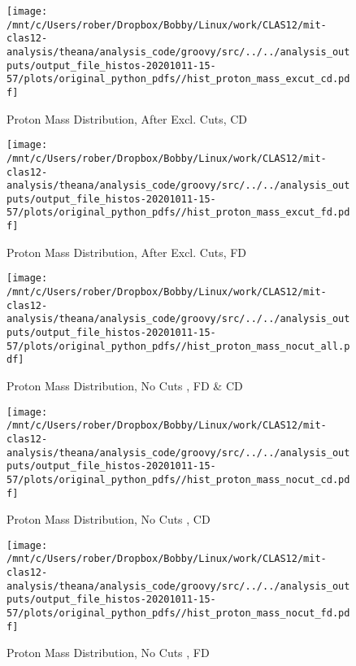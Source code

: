 \documentclass{article}
\begin{document}
\begin{landscape}
\begin{figure}[h]
        \texttt{[image: /mnt/c/Users/rober/Dropbox/Bobby/Linux/work/CLAS12/mit-clas12-analysis/theana/analysis\_code/groovy/src/../../analysis\_outputs/output\_file\_histos-20201011-15-57/plots/original\_python\_pdfs//hist\_proton\_mass\_excut\_cd.pdf]}
        \captionsetup{textformat=empty,labelformat=blank}
        \caption{Proton Mass Distribution, After Excl. Cuts, CD}
    \end{figure}
    \clearpage
    
    \begin{figure}[h]
        \centering

        \texttt{[image: /mnt/c/Users/rober/Dropbox/Bobby/Linux/work/CLAS12/mit-clas12-analysis/theana/analysis\_code/groovy/src/../../analysis\_outputs/output\_file\_histos-20201011-15-57/plots/original\_python\_pdfs//hist\_proton\_mass\_excut\_fd.pdf]}
        \captionsetup{textformat=empty,labelformat=blank}
        \caption{Proton Mass Distribution, After Excl. Cuts, FD}
    \end{figure}
    \clearpage
    
    \begin{figure}[h]
        \centering

        \texttt{[image: /mnt/c/Users/rober/Dropbox/Bobby/Linux/work/CLAS12/mit-clas12-analysis/theana/analysis\_code/groovy/src/../../analysis\_outputs/output\_file\_histos-20201011-15-57/plots/original\_python\_pdfs//hist\_proton\_mass\_nocut\_all.pdf]}
        \captionsetup{textformat=empty,labelformat=blank}
        \caption{Proton Mass Distribution, No Cuts , FD \& CD}
    \end{figure}
    \clearpage
    
    \begin{figure}[h]
        \centering

        \texttt{[image: /mnt/c/Users/rober/Dropbox/Bobby/Linux/work/CLAS12/mit-clas12-analysis/theana/analysis\_code/groovy/src/../../analysis\_outputs/output\_file\_histos-20201011-15-57/plots/original\_python\_pdfs//hist\_proton\_mass\_nocut\_cd.pdf]}
        \captionsetup{textformat=empty,labelformat=blank}
        \caption{Proton Mass Distribution, No Cuts , CD}
    \end{figure}
    \clearpage
    
    \begin{figure}[h]
        \centering

        \texttt{[image: /mnt/c/Users/rober/Dropbox/Bobby/Linux/work/CLAS12/mit-clas12-analysis/theana/analysis\_code/groovy/src/../../analysis\_outputs/output\_file\_histos-20201011-15-57/plots/original\_python\_pdfs//hist\_proton\_mass\_nocut\_fd.pdf]}
        \captionsetup{textformat=empty,labelformat=blank}
        \caption{Proton Mass Distribution, No Cuts , FD}
    \end{figure}
    \clearpage
    

\end{landscape}
\end{document}
